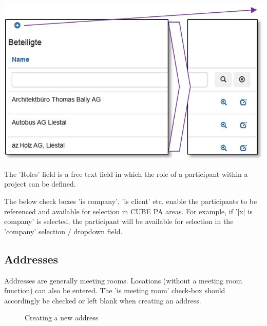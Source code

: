 \begin{center}
\hspace{-15pt}   
\includegraphics[width=.9\linewidth]{../chapters/13_Konfigurationen/pictures/13-4_Beteiligte.jpg}
\end{center}

The 'Roles' field is a free text field in which the role of a participant within a project can be defined.

\vspace{\baselineskip}

The below check boxes 'is company', 'is client' etc. enable the participants to be referenced and available for selection in CUBE PA areas. For example, if '[x] is company' is selected, the participant will be available for selection in the 'company' selection / dropdown field.

\vspace{\baselineskip}
\vspace{\baselineskip}
\vspace{\baselineskip}

\subsection{Addresses}

Addresses are generally meeting rooms. Locations (without a meeting room function) can also be entered. The 'is meeting room' check-box should accordingly be checked or left blank when creating an address. 

\begin{figure}[H]
\caption{Creating a new address}
\end{figure}

